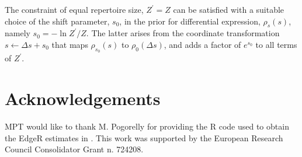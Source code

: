 \documentclass[pre,twocolumn,english,longbibliography]{revtex4}
\newcommand{\<}{\langle}
\renewcommand{\>}{\rangle}
\begin{document}
The constraint of equal repertoire size, $Z^\prime=Z$ can be satisfied with a suitable choice of the shift parameter, $s_0$, in the prior for differential expression, $\rho_{s}(s)$, namely $s_0=-\ln Z^\prime/Z$. The latter arises from the coordinate transformation $s\leftarrow\Delta s+s_0$ that maps $\rho_{s_0}(s)$ to $\rho_{0}(\Delta s)$, and adds a factor of $e^{s_0}$ to all terms of $Z^\prime$.



\section*{Acknowledgements}
MPT would like to thank M. Pogorelly for providing the R code used to obtain the EdgeR estimates in \citep{Pogorelyy2018c}.  This work was supported by the European Research Council Consolidator Grant n. 724208.
\end{document}
